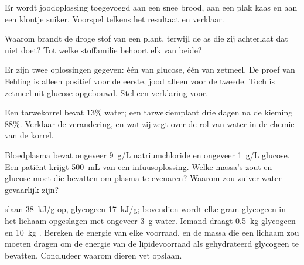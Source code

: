 \begin{exercise}[$\star\star$]\label{exo:g10:chemistry-of-life:9}
Er wordt joodoplossing toegevoegd aan een snee brood, aan een plak kaas
en aan een klontje suiker. Voorspel telkens het resultaat en verklaar.
\end{exercise}

\begin{exercise}[$\star\star$]\label{exo:g10:chemistry-of-life:10}
Waarom brandt de droge stof van een plant, terwijl de as die zij
achterlaat dat niet doet? Tot welke stoffamilie behoort elk van beide?
\end{exercise}

\begin{exercise}[$\star\star$]\label{exo:g10:chemistry-of-life:11}
Er zijn twee oplossingen gegeven: één van glucose, één van zetmeel. De
proef van Fehling is alleen positief voor de eerste, jood alleen voor de
tweede. Toch is zetmeel uit glucose opgebouwd. Stel een verklaring voor.
\end{exercise}

\begin{exercise}[$\star\star\star$]\label{exo:g10:chemistry-of-life:12}
Een tarwekorrel bevat 13\% water; een tarwekiemplant drie dagen na de
kieming 88\%. Verklaar de verandering, en wat zij zegt over de rol van
water in de chemie van de korrel.
\end{exercise}

\begin{exercise}[$\star\star\star$]\label{exo:g10:chemistry-of-life:13}
Bloedplasma bevat ongeveer \qty{9}{g/L} natriumchloride en ongeveer
\qty{1}{g/L} glucose. Een patiënt krijgt \qty{500}{mL} van een
infuusoplossing. Welke massa's zout en glucose moet die bevatten om
plasma te evenaren? Waarom zou zuiver water gevaarlijk zijn?
\end{exercise}

\begin{exercise}[$\star\star\star$]\label{exo:g10:chemistry-of-life:14}
 slaan \qty{38}{kJ/g} op, glycogeen \qty{17}{kJ/g}; bovendien
wordt elke gram glycogeen in het lichaam opgeslagen met ongeveer
\qty{3}{g} water. Iemand draagt \qty{0.5}{kg} glycogeen en \qty{10}{kg}
. Bereken de energie van elke voorraad, en de massa die een
lichaam zou moeten dragen om de energie van de lipidevoorraad als
gehydrateerd glycogeen te bevatten. Concludeer waarom dieren vet
opslaan.
\end{exercise}

